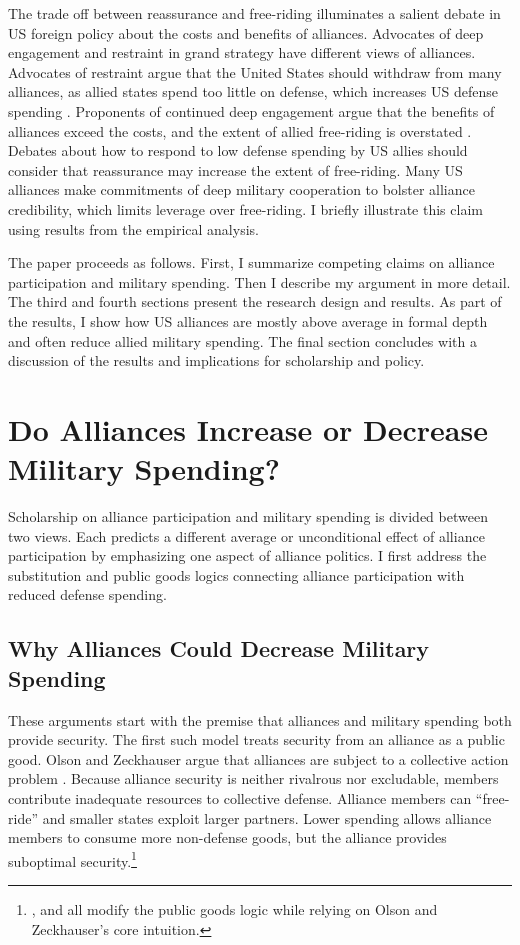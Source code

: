 \documentclass[12pt]{article}
\begin{document}
The trade off between reassurance and free-riding illuminates a salient debate in US foreign policy about the costs and benefits of alliances. 
Advocates of deep engagement \citep{Brooksetal2013} and restraint \citep{Posen2014} in grand strategy have different views of alliances. 
Advocates of restraint argue that the United States should withdraw from many alliances, as allied states spend too little on defense, which increases US defense spending \citep{Preble2009}.
Proponents of continued deep engagement argue that the benefits of alliances exceed the costs, and the extent of allied free-riding is overstated \citep{BrandsFeaver2017}. 
Debates about how to respond to low defense spending by US allies should consider that reassurance may increase the extent of free-riding. 
Many US alliances make commitments of deep military cooperation to bolster alliance credibility, which limits leverage over free-riding. 
I briefly illustrate this claim using results from the empirical analysis. 


The paper proceeds as follows. 
First, I summarize competing claims on alliance participation and military spending. 
Then I describe my argument in more detail. 
The third and fourth sections present the research design and results. 
As part of the results, I show how US alliances are mostly above average in formal depth and often reduce allied military spending. 
The final section concludes with a discussion of the results and implications for scholarship and policy.  



\section{Do Alliances Increase or Decrease Military Spending?}


Scholarship on alliance participation and military spending is divided between two views.
Each predicts a different average or unconditional effect of alliance participation by emphasizing one aspect of alliance politics.  
I first address the substitution and public goods logics connecting alliance participation with reduced defense spending. 


\subsection{Why Alliances Could Decrease Military Spending} 


These arguments start with the premise that alliances and military spending both provide security.
The first such model treats security from an alliance as a public good. 
Olson and Zeckhauser argue that alliances are subject to a collective action problem \citep{OlsonZeckhauser1966}.
Because alliance security is neither rivalrous nor excludable, members contribute inadequate resources to collective defense. 
Alliance members can ``free-ride'' and smaller states exploit larger partners. 
Lower spending allows alliance members to consume more non-defense goods, but the alliance provides suboptimal security.\footnote{\citet{SandlerForbes1980}, \citet{Oneal1990} and \citet{SandlerHartley2001} all modify the public goods logic while relying on Olson and Zeckhauser's core intuition.} 
\end{document}

